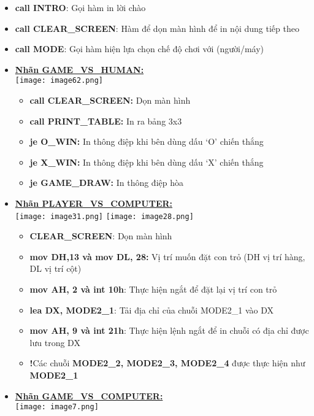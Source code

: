 \begin{itemize}
    \item \textbf{call INTRO}: Gọi hàm in lời chào
    \item \textbf{call CLEAR\_SCREEN}:  Hàm để dọn màn hình để in nội dung tiếp theo 
    \item \textbf{call MODE}: Gọi hàm hiện lựa chọn chế độ chơi với (người/máy)
    
    \item \textbf{\underline{Nhãn GAME\_VS\_HUMAN:}}\\
    \texttt{[image: image62.png]}
    \begin{itemize}
        \item \textbf{call CLEAR\_SCREEN:} Dọn màn hình
        \item \textbf{call PRINT\_TABLE:} In ra bảng 3x3
        \item \textbf{je O\_WIN:} In thông điệp khi bên dùng dấu ‘O’ chiến thắng
        \item \textbf{je X\_WIN:} In thông điệp khi bên dùng dấu ‘X’ chiến thắng 
        \item \textbf{je GAME\_DRAW: }In thông điệp hòa
    \end{itemize}
    \item \textbf{\underline{Nhãn PLAYER\_VS\_COMPUTER:}}\\
    \texttt{[image: image31.png]}
    \texttt{[image: image28.png]}
    \begin{itemize}
        \item \textbf{CLEAR\_SCREEN}: Dọn màn hình 
        \item \textbf{mov DH,13 và mov DL, 28:} Vị trí muốn đặt con trỏ (DH vị trí hàng, DL vị trí cột)
        \item \textbf{mov AH, 2 và int 10h}: Thực hiện ngắt để đặt lại vị trí con trỏ
        \item \textbf{lea DX, MODE2\_1}: Tải địa chỉ của chuỗi MODE2\_1 vào DX
        \item \textbf{mov AH, 9 và int 21h}: Thực hiện lệnh ngắt để in chuỗi có địa chỉ được lưu trong DX
        \item[] \textbf{\large !}Các chuỗi \textbf{MODE2\_2, MODE2\_3, MODE2\_4} được thực hiện như \textbf{MODE2\_1}
    \end{itemize}
    \item \textbf{\underline{Nhãn GAME\_VS\_COMPUTER:}}\\
    \texttt{[image: image7.png]}
    

\end{itemize}
